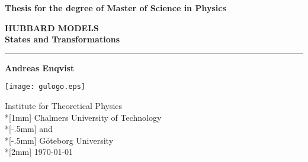 \documentclass[a4paper,12pt,twoside,openright]{UGthesis}
\newcommand\ffam{\sffamily}
\newcommand\fser{\bfseries}
\newcommand\fsh{\upshape}
\newcommand\blankpage{\thispagestyle{empty}\mbox{}\newpage}
\begin{document}
%
%

%


\setcounter{page}{1}

%
%

\thispagestyle{empty}


\begin{center}
  {\fsh\ffam\fser Thesis for the degree of Master of Science in
     Physics}
\end{center}



\begin{center}
{\upshape\sffamily\bfseries\huge HUBBARD MODELS} \\[4mm]
{\upshape\sffamily\bfseries\large States and Transformations}\\[4mm]
\end{center}

\vspace*{2mm}
\begin{center}
        \rule{110mm}{2pt}
\end{center}

\vspace*{4mm}
\begin{center}
  {\fsh\ffam\fser\Large Andreas Enqvist}\\
\end{center}
\vfill
\vspace{3 cm}
\begin{center}
\texttt{[image: gulogo.eps]}
\end{center}

\vfill
\begin{center}
        {\ffam\fsh Institute for Theoretical Physics\\*[1mm]
        Chalmers University of Technology\\*[-.5mm]
        and\\*[-.5mm]
        G\"oteborg University\\*[2mm]
        \today}
\end{center}
\end{document}
